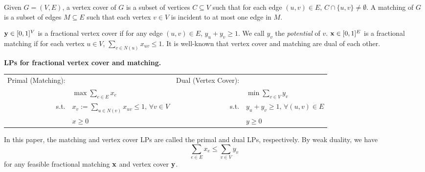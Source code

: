 \documentclass{article}
\newcommand{\bx}{{\bf{x}}}
\newcommand{\by}{{\bf{y}}}
\begin{document}
Given $G=(V,E)$, a vertex cover of $G$ is a subset of vertices $C\subseteq V$ such that for each edge $(u,v) \in E$, $C\cap \{u,v\} \neq \emptyset$. A matching of $G$ is a subset of edges $M\subseteq E$ such that each vertex $v \in V$ is incident to at most one edge in $M$.

$\by\in [0,1]^V$ is a fractional vertex cover if for any edge $(u,v)\in E$, $y_u+y_v \geq 1$. We call $y_v$ the {\em potential} of $v$.  $\bx\in [0,1]^E$ is a fractional matching if for each vertex $u\in V$, $\sum_{v\in N(u)} x_{uv} \leq 1$. It is well-known that vertex cover and matching are dual of each other.

{\bf LPs for fractional vertex cover and matching.}

\begin{center}
\begin{tabular}{ | r l | r l | }
\hline
Primal (Matching): & & Dual (Vertex Cover): &\\
 & $\max\sum_{e\in E} x_e$ &  & $\min\sum_{v\in V}y_v$ \\
s.t. & $ x_v:=\sum_{u\in N(v)} x_{uv}\leq 1,\,\forall v\in V$ & s.t. & $y_u+y_v\geq 1,\,\forall (u,v)\in E$ \\
&  $x\geq 0$ & & $y\geq 0$ \\
\hline
\end{tabular}
\end{center}

In this paper, the matching and vertex cover LPs are called the primal and dual LPs, respectively. By weak duality, we have $$\sum_{e\in E} x_e\leq\sum_{v\in V}y_v $$ for any feasible fractional matching $\bx$ and vertex cover $\by$.

%
%
%
\end{document}

